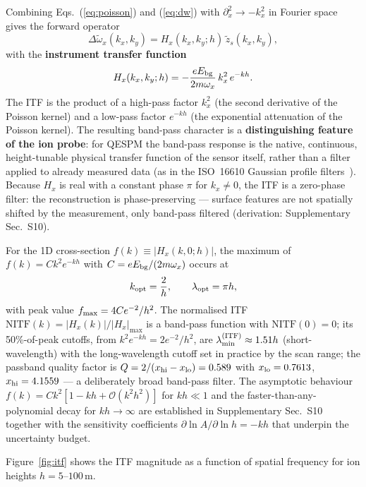 \documentclass[12pt,a4paper]{article}
\begin{document}
Combining Eqs.~(\ref{eq:poisson}) and (\ref{eq:dw}) with
$\partial_x^2\to-k_x^2$ in Fourier space gives the forward operator
\begin{equation}
\Delta\tilde{\omega}_x(k_x,k_y) = H_x(k_x,k_y;h)\,
        \tilde{z}_s(k_x,k_y),
\label{eq:forward}
\end{equation}
with the \textbf{instrument transfer function}
\begin{equation}
H_x(k_x,k_y;h) = -\frac{e E_{\rm bg}}{2m\omega_x}\,
        k_x^2\,e^{-kh}.
\label{eq:itf}
\end{equation}
The ITF is the product of a high-pass factor $k_x^2$ (the second
derivative of the Poisson kernel) and a low-pass factor $e^{-kh}$ (the
exponential attenuation of the Poisson kernel).  The resulting band-pass
character is a \textbf{distinguishing feature of the ion probe}: for
QESPM the band-pass response is the native, continuous, height-tunable
physical transfer function of the sensor itself, rather than a filter
applied to already measured data (as in the ISO~16610 Gaussian profile
filters~\cite{iso16610}).  Because $H_x$ is real with a constant phase
$\pi$ for $k_x\neq0$, the ITF is a zero-phase filter: the reconstruction
is phase-preserving --- surface features are not spatially shifted by the
measurement, only band-pass filtered (derivation: Supplementary Sec.~S10).

For the 1D cross-section $f(k)\equiv|H_x(k,0;h)|$, the maximum of
$f(k)=Ck^2e^{-kh}$ with $C=eE_{\rm bg}/(2m\omega_x)$ occurs at
\begin{equation}
k_{\rm opt} = \frac{2}{h}, \qquad
    \lambda_{\rm opt} = \pi h,
\label{eq:scaling_kopt}
\end{equation}
with peak value $f_{\rm max}=4Ce^{-2}/h^2$.  The normalised ITF
$\mathrm{NITF}(k)=|H_x(k)|/|H_x|_{\max}$ is a band-pass function with
$\mathrm{NITF}(0)=0$; its 50\%-of-peak cutoffs, from
$k^2e^{-kh}=2e^{-2}/h^2$, are
$\lambda_{\min}^{\rm(ITF)}\approx1.51h$ (short-wavelength) with the
long-wavelength cutoff set in practice by the scan range; the passband
quality factor is $Q=2/(x_{\rm hi}-x_{\rm lo})=0.589$ with
$x_{\rm lo}=0.7613$, $x_{\rm hi}=4.1559$ --- a deliberately broad
band-pass filter.  The asymptotic behaviour
$f(k)=Ck^2[1-kh+\mathcal{O}(k^2h^2)]$ for $kh\ll1$ and the
faster-than-any-polynomial decay for $kh\to\infty$ are established in
Supplementary Sec.~S10 together with the sensitivity coefficients
$\partial\ln A/\partial\ln h=-kh$ that underpin the uncertainty budget.

Figure~\ref{fig:itf} shows the ITF magnitude as a function of spatial
frequency for ion heights $h=5$--$100$\,\textmu m.
\end{document}
